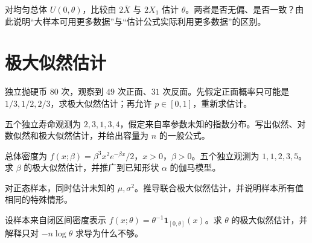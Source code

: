 \begin{exercise}[样本分位数的直观比较]\label{q:B9.8}
对均匀总体 $U(0,\theta)$，比较由 $2\overline X$ 与 $2X_1$ 估计 $\theta$。两者是否无偏、是否一致？由此说明“大样本可用更多数据”与“估计公式实际利用更多数据”的区别。\par{}\end{exercise}

\clearpage\section{极大似然估计}

\begin{exercise}[离散参数空间中的硬币似然]\label{q:M-C10-1}
独立抛硬币 $80$ 次，观察到 $49$ 次正面、$31$ 次反面。先假定正面概率只可能是 $1/3,1/2,2/3$，求极大似然估计；再允许 $p\in[0,1]$，重新求估计。\par{}\end{exercise}

\begin{exercise}[指数寿命的极大似然估计]\label{q:M-C10-2}
五个独立寿命观测为 $2,3,1,3,4$，假定来自率参数未知的指数分布。写出似然、对数似然和极大似然估计，并给出容量为 $n$ 的一般公式。\par{}\end{exercise}

\begin{exercise}[已知形状的伽马率估计]\label{q:M-E2-II1}
总体密度为 $f(x;\beta)=\beta^3x^2e^{-\beta x}/2$，$x>0$，$\beta>0$。五个独立观测为 $1,1,2,3,5$。求 $\beta$ 的极大似然估计，并推广到已知形状 $\alpha$ 的伽马模型。\par{}\end{exercise}

\begin{exercise}[正态模型的联合极大似然]\label{q:B10.1}
对正态样本，同时估计未知的 $\mu,\sigma^2$。推导联合极大似然估计，并说明样本所有值相同的特殊情形。\par{}\end{exercise}

\begin{exercise}[均匀端点与支撑集]\label{q:B10.2}
设样本来自闭区间密度表示 $f(x;\theta)=\theta^{-1}\mathbf1_{[0,\theta]}(x)$。求 $\theta$ 的极大似然估计，并解释只对 $-n\log\theta$ 求导为什么不够。\par{}\end{exercise}

